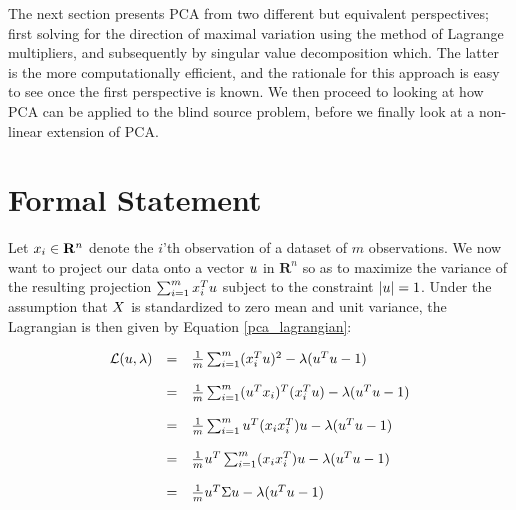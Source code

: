 \documentclass[11pt, oneside, a4paper]{report}
\begin{document}
The next section presents PCA from two different but equivalent
perspectives; first solving for the direction of maximal variation
using the method of Lagrange multipliers, and subsequently by singular
value decomposition which. The latter is the more computationally
efficient, and the rationale for this approach is easy to see once the
first perspective is known. We then proceed to looking at how PCA can
be applied to the blind source problem, before we finally look at a
non-linear extension of PCA.


\section{Formal Statement}

Let $\boldmath{x}_i \in \mathbf{R}^n$ denote the $i$'th observation of a dataset
of $m$ observations. We now want to project our data onto a vector $\boldmath{u}$
in $\mathbf{R}^n$ so as to maximize the variance of the resulting
projection $\sum_{i=1}^m \boldmath{x}_i^T \boldmath{u}$ subject to the constraint
$|\boldmath{u}|=1$. Under the assumption that $\boldmath{X}$ is standardized to zero mean
and unit variance, the Lagrangian is then given by Equation \ref{pca_lagrangian}:

  \begin{equation}
    \label{pca_lagrangian}
    \begin{array}{lcl}
      \mathcal{L}(u,\lambda) & = & \frac{1}{m} \sum_{i=1}^m (\boldmath{x}_i^T \boldmath{u})^2 - \lambda (\boldmath{u}^T \boldmath{u} -1) \\
      \\& = & \frac{1}{m} \sum_{i=1}^m (\boldmath{u}^T \boldmath{x}_i)^T(\boldmath{x}_i^T \boldmath{u}) - \lambda (\boldmath{u}^T \boldmath{u} -1) \\
      \\& = & \frac{1}{m} \sum_{i=1}^m \boldmath{u}^T(\boldmath{x}_i \boldmath{x}_i^T)u - \lambda (\boldmath{u}^T \boldmath{u} -1) \\
      \\& = & \frac{1}{m}  u^T\sum_{i=1}^m(\boldmath{x}_i \boldmath{x}_i^T)\boldmath{u} - \lambda (\boldmath{u}^T \boldmath{u} -1) \\
      \\& = & \frac{1}{m} \boldmath{u}^T \boldmath{\Sigma} \boldmath{u} - \lambda (\boldmath{u}^T \boldmath{u} -1) \\
    \end{array}
  \end{equation}
\end{document}
